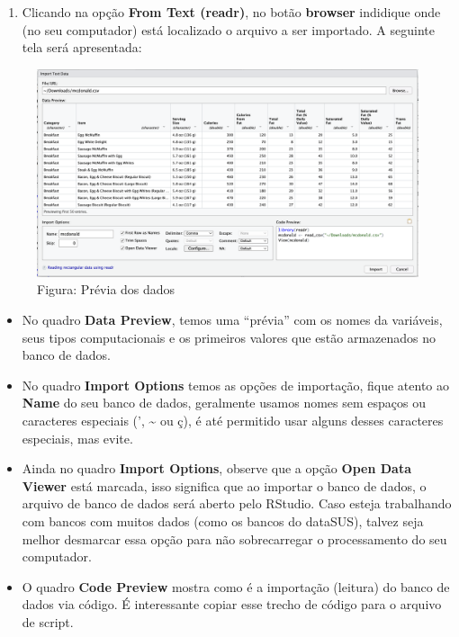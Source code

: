 \documentclass[
]{book}
\providecommand{\tightlist}{%
  \setlength{\itemsep}{0pt}\setlength{\parskip}{0pt}}
\begin{document}
\begin{enumerate}
\def\labelenumi{\arabic{enumi}.}
\setcounter{enumi}{2}
\tightlist
\item
  Clicando na opção \textbf{From Text (readr)}, no botão \textbf{browser} indidique onde (no seu computador) está localizado o arquivo a ser importado. A seguinte tela será apresentada:
\end{enumerate}

\begin{figure}
\centering
\includegraphics{telaImportBrowser.png}
\caption{ Figura: Prévia dos dados}
\end{figure}

\begin{itemize}
\item
  No quadro \textbf{Data Preview}, temos uma ``prévia'' com os nomes da variáveis, seus tipos computacionais e os primeiros valores que estão armazenados no banco de dados.
\item
  No quadro \textbf{Import Options} temos as opções de importação, fique atento ao \textbf{Name} do seu banco de dados, geralmente usamos nomes sem espaços ou caracteres especiais (', \textasciitilde{} ou ç), é até permitido usar alguns desses caracteres especiais, mas evite.
\item
  Ainda no quadro \textbf{Import Options}, observe que a opção \textbf{Open Data Viewer} está marcada, isso significa que ao importar o banco de dados, o arquivo de banco de dados será aberto pelo RStudio. Caso esteja trabalhando com bancos com muitos dados (como os bancos do dataSUS), talvez seja melhor desmarcar essa opção para não sobrecarregar o processamento do seu computador.
\item
  O quadro \textbf{Code Preview} mostra como é a importação (leitura) do banco de dados via código. É interessante copiar esse trecho de código para o arquivo de script.
\end{itemize}
\end{document}
